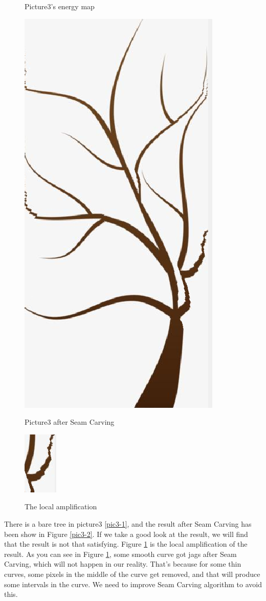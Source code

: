 \documentclass[final]{cvpr}
\begin{document}
\begin{figure}
\begin{center}
    \caption{Picture3's energy map}
    \includegraphics[scale=0.15]{pics/3-2.png}
    \caption{Picture3 after Seam Carving}
    \label{pic3-2}
    \includegraphics[scale=0.5]{pics/3-3.png}
    \caption{The local amplification}
    \label{pic3-3} 
\end{center}
\end{figure}

There is a bare tree in picture3 \ref{pic3-1}, and the result after Seam Carving has been show in Figure \ref{pic3-2}. If we take a good look at the result, we will find that the result is not that satisfying. Figure \ref{pic3-3} is the local amplification of the result. As you can see in Figure \ref{pic3-3}, some smooth curve got jags after Seam Carving, which will not happen in our reality. That's because for some thin curves, some pixels in the middle of the curve get removed, and that will produce some intervals in the curve. We need to improve Seam Carving algorithm to avoid this.
\end{document}
